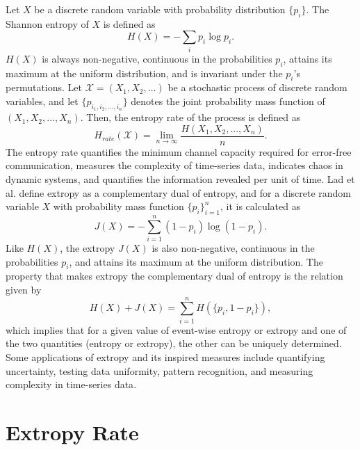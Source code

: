 \documentclass[pdflatex]{sn-jnl}%
\theoremstyle{thmstyleone}
\theoremstyle{thmstyletwo}%
\theoremstyle{thmstylethree}%
\begin{document}
Let $X$ be a discrete random variable with probability distribution $\{p_i\}$. The Shannon entropy\cite{shannon1948mathematical} of $X$ is defined as 
\begin{equation}
    H(X)=-\sum_{i}p_i \log p_i.
\end{equation}
$H(X)$ is always non-negative, continuous in the probabilities $p_i$, attains its maximum at the uniform distribution, and is invariant under the $p_i$'s permutations. Let $\mathcal{X} = (X_1, X_2, \dots)$ be a stochastic process of discrete random variables, and let $\{p_{i_1, i_2, \dots, i_n}\}$ denotes the joint probability mass function of $(X_1, X_2, \dots, X_n)$. Then, the entropy rate of the process is defined as
\begin{equation}
    H_{rate}(\mathcal{X})=\lim_{n \to \infty}\frac{H(X_1, X_2, ..., X_n)}{n}.
\end{equation}
The entropy rate quantifies the minimum channel capacity required for error-free communication\cite{shannon1948mathematical}, measures the complexity of time-series data\cite{paluvs1996coarse}, indicates chaos in dynamic systems\cite{hilborn2000chaos}, and quantifies the information revealed per unit of time\cite{kennel2005estimating}. Lad et al.\cite{lad2015extropy} define extropy as a complementary dual of entropy, and for a discrete random variable $X$ with probability mass function $\{p_i\}_{i=1}^{n}$, it is calculated as
\begin{equation}
    J(X)=-\sum_{i=1}^{n}(1-p_i)\log(1-p_i).
\end{equation}
Like $H(X)$, the extropy $J(X)$ is also non-negative, continuous in the probabilities $p_i$, and attains its maximum at the uniform distribution. The property that makes extropy the complementary dual of entropy is the relation given by 
\begin{equation}
H(X)+J(X)=\sum_{i=1}^{n}H(\{p_i, 1-p_i\}), 
\end{equation}
which implies that for a given value of event-wise entropy or extropy and one of the two quantities (entropy or extropy), the other can be uniquely determined. Some applications of extropy and its inspired measures include quantifying uncertainty, testing data uniformity, pattern recognition, and measuring complexity in time-series data\cite{deng2024plausibility,qiu2018extropy,balakrishnan2022tsallis,giri2025permutation}.




\section{Extropy Rate}\label{extropyrate}
\end{document}

